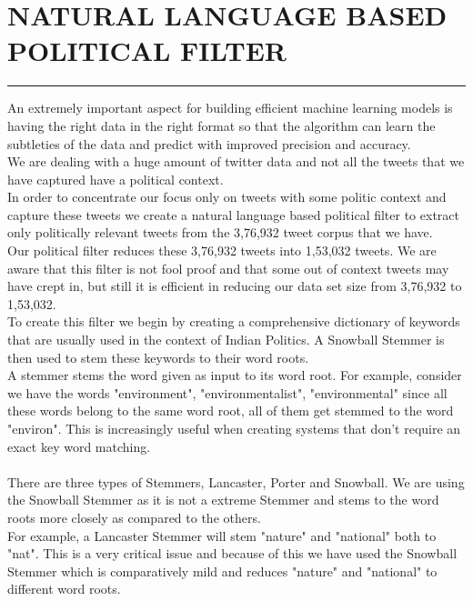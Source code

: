 \documentclass[a4paper,11pt]{article}
\begin{document}
\newpage

\section{NATURAL LANGUAGE BASED POLITICAL FILTER}
\hrule
\vspace*{5mm}
An extremely important aspect for building efficient machine learning models is having the right data in the right format so that the algorithm can learn the subtleties of the data and predict with improved precision and accuracy.
\medskip\\
We are dealing with a huge amount of twitter data and not all the tweets that we have captured have a political context.
\medskip\\
In order to concentrate our focus only on tweets with some politic context and capture these tweets we create a natural language based political filter to extract only politically relevant tweets from the 3,76,932 tweet corpus that we have.
\medskip\\
Our political filter reduces these 3,76,932 tweets into 1,53,032 tweets. We are aware that this filter is not fool proof and that some out of context tweets may have crept in, but still it is efficient in reducing our data set size from 3,76,932 to 1,53,032.
\medskip\\ 
To create this filter we begin by creating a comprehensive dictionary of keywords that are usually used in the context of Indian Politics. A Snowball Stemmer is then used to stem these keywords to their word roots. 
\medskip\\
A stemmer stems the word given as input to its word root. For example, consider we have the words "environment", "environmentalist", "environmental" since all these words belong to the same word root, all of them get stemmed to the word "environ". This is increasingly useful when creating systems that don't require an exact key word matching.
\medskip\\
\medskip\\
There are three types of Stemmers, Lancaster, Porter and Snowball. We are using the Snowball Stemmer as it is not a extreme Stemmer and stems to the word roots more closely as compared to the others. 
\medskip\\
For example, a Lancaster Stemmer will stem "nature" and "national" both to "nat". This is a very critical issue and because of this we have used the Snowball Stemmer which is comparatively mild and reduces "nature" and "national" to different word roots.
\end{document}
